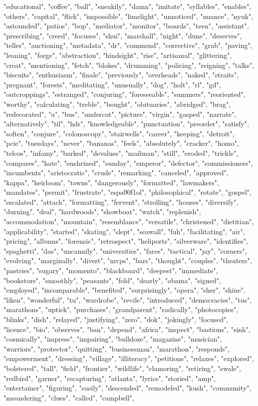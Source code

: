 "educational", "coffee", "ball", "sneakily", "damn", "imitate", "syllables", "enables", "others", "capital", "flick", "impossible", "limelight", "unnoticed", "nuance", "nyuk", "astounded", "patios", "bop", "mediator", "monitor", "boards", "teen", "assistant", "prescribing", "creed", "focuses", "shui", "marshall", "night", "dune", "deserves", "teller", "auctioning", "metadata", "dr", "commend", "corrective", "grab", "paving", "leaning", "forge", "abstraction", "hindsight", "rise", "artisanal", "glittering", "creat", "mentioning", "fetch", "blokes", "drumming", "policing", "reigning", "talks", "biscuits", "enthusiasm", "finale", "previously", "overheads", "naked", "straits", "pregnant", "forests", "meditating", "unusually", "dog", "holt", "rl", "gd", "outcroppings", "estranged", "conjuring", "foreseeable", "summers", "reoriented", "worthy", "calculating", "treble", "bought", "obituaries", "abridged", "brag", "redecorated", "u", "bus", "undercut", "picture", "virgin", "gasped", "narrate", "alternatively", "til", "hdr", "knowledgeable", "punctuation", "preorder", "satisfy", "soften", "conjure", "colonoscopy", "stairwells", "career", "keeping", "detroit", "pcie", "tuesdays", "never", "bananas", "feels", "absolutely", "cracker", "homo", "telcos", "infamy", "barked", "devalues", "mailman", "still", "eroded", "trickle", "compares", "hate", "enshrined", "sunday", "emperor", "defector", "commissioners", "incumbents", "aristocratic", "crude", "remarking", "canceled", "approved", "kappa", "heirloom", "towns", "dangerously", "formatted", "lawmakers", "mandates", "permit", "frustrate", "espa\u00f1ol", "philosophical", "rotate", "gospel", "escalated", "attach", "formatting", "fervent", "strolling", "houses", "diversify", "durning", "deal", "hardwoods", "showboat", "watch", "replenish", "accommodation", "mountain", "resemblance", "versatile", "christened", "dietitian", "applicability", "started", "skating", "slept", "seawall", "fuh", "facilitating", "air", "pricing", "albums", "forensic", "retrospect", "heliports", "silverware", "identifies", "spaghetti", "das", "uncannily", "universities", "fares", "tactical", "jay", "corners", "evolving", "marginally", "divert", "mvps", "bars", "thought", "couples", "theaters", "pastries", "sugary", "momento", "blackboard", "deepest", "immediate", "bookstore", "smoothly", "peasants", "fold", "dearly", "obama", "signed", "employed", "incomparable", "benefited", "surprisingly", "opera", "sher", "shine", "liken", "wonderful", "tu", "wardrobe", "revile", "introduced", "democracies", "tus", "marathons", "uptick", "purchases", "grandparent", "radically", "photocopies", "blinks", "dish", "relayed", "justifying", "zero", "dok", "jokingly", "focused", "licence", "bio", "observes", "ban", "depend", "africa", "inspect", "bastions", "sinh", "cosmically", "impress", "impairing", "bulldoze", "magazine", "musician", "warriors", "protector", "quitting", "businessman", "marathon", "responds", "empowerment", "dressing", "village", "illiteracy", "petitions", "relaxes", "explored", "bolstered", "tall", "field", "frontier", "wildlife", "clamoring", "retiring", "swale", "redbird", "garner", "recapturing", "atlanta", "lyrics", "storied", "amp", "entertainer", "figuring", "easily", "descended", "remodeled", "kush", "community", "meandering", "clues", "called", "campbell", 
